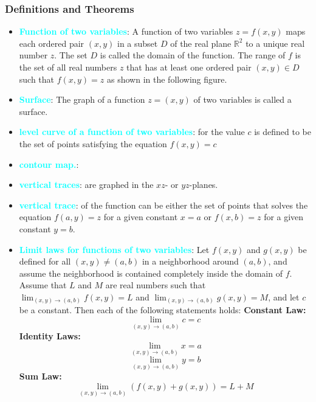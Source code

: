 \documentclass{report}
\begin{document}
    \subsubsection{Definitions and Theorems}
    \begin{itemize}
        \item \textbf{\textcolor{cyan}{Function of two variables}}:
            A function of two variables $z=f(x,y)$ maps each ordered pair $(x,y)$ in a subset $D$ of the real plane $\mathbb{R}^2$ to a unique real number $z$. The set $D$ is called the domain of the function. The range of $f$ is the set of all real numbers $z$ that has at least one ordered pair $(x,y) \in D$ such that $f(x,y) = z$ as shown in the following figure.
        \item \textbf{\textcolor{cyan}{Surface}}: The graph of a function  $z=(x,y)$ of two variables is called a surface.
        \item \textbf{\textcolor{cyan}{level curve of a function of two variables}}: for the value  $c$ is defined to be the set of points satisfying the equation  $f(x,y)=c$
        \item \textbf{\textcolor{cyan}{contour map.}}:
        \item \textbf{\textcolor{cyan}{vertical traces}}: are graphed in the  $xz$- or  $yz$-planes.
        \item \textbf{\textcolor{cyan}{vertical trace}}: of the function can be either the set of points that solves the equation $f(a,y)=z$ for a given constant $x=a$ or $f(x,b)=z$ for a given constant $y=b$.
        \item \textbf{\textcolor{cyan}{Limit laws for functions of two variables}}:
            Let $f(x,y)$ and $g(x,y)$ be defined for all $(x,y) \neq (a,b)$ in a neighborhood around $(a,b)$, and assume the neighborhood is contained completely inside the domain of $f$. Assume that $L$ and $M$ are real numbers such that $\lim_{(x,y) \to (a,b)} f(x,y) = L$ and $\lim_{(x,y) \to (a,b)} g(x,y) = M$, and let $c$ be a constant. Then each of the following statements holds:
            \bigbreak \noindent 
            \textbf{Constant Law:}
            \[
                \lim_{(x,y) \to (a,b)} c = c \tag{4.2}
            \]
            \textbf{Identity Laws:}
            \[
                \lim_{(x,y) \to (a,b)} x = a \tag{4.3}
            \]
            \[
                \lim_{(x,y) \to (a,b)} y = b \tag{4.4}
            \]
            \textbf{Sum Law:}
            \[
                \lim_{(x,y) \to (a,b)} (f(x,y) + g(x,y)) = L + M \tag{4.5}
            \]

\end{itemize}
\end{document}

